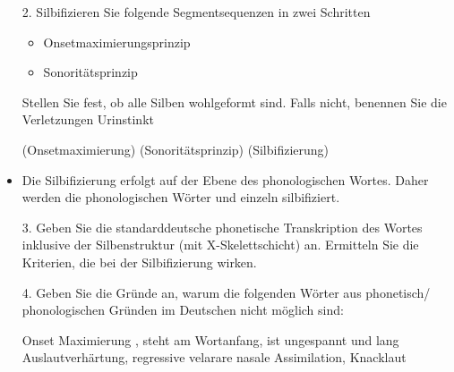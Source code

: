 {\begin{frame}
\begin{exe}
\end{exe}

\end{frame}
	
\begin{frame}
	\begin{itemize}
		\item[2.] Silbifizieren Sie folgende Segmentsequenzen in zwei Schritten
			\begin{itemize}
				\item Onsetmaximierungsprinzip
				\item Sonoritätsprinzip
			\end{itemize}
			
		Stellen Sie fest, ob alle Silben wohlgeformt sind. Falls nicht, benennen Sie die Verletzungen	
		\ea
		Urinstinkt
		\z
		
		\eal
		\ex \textipa{[Pu.\;RI.nStInkt]} (Onsetmaximierung)
		\ex {} (Sonoritätsprinzip)
		\ex {} (Silbifizierung)
		\zl 
		\item Die Silbifizierung erfolgt auf der Ebene des phonologischen Wortes. Daher werden die phonologischen Wörter  und  einzeln silbifiziert.
	
	\end{itemize}
\end{frame}


\begin{frame}
	\begin{itemize}	
		\item[3.] Geben Sie die standarddeutsche phonetische Transkription des Wortes  inklusive der Silbenstruktur (mit X-Skelettschicht) an. Ermitteln Sie die Kriterien, die bei der Silbifizierung wirken.
			
		\end{itemize}
\end{frame}


\begin{frame}
	\begin{itemize}
					
		\item[4.] Geben Sie die Gründe an, warum die folgenden Wörter aus phonetisch/ phonologischen Gründen im Deutschen nicht möglich sind:
			
		\eal
		\ex[*]{\textipa{['Napl.O:t]}} Onset Maximierung \textipa{[pl]}, \textipa{[N]} steht am Wortanfang, \textipa{[O]} ist ungespannt und lang
		\ex[*]{\textipa{[a\;R.'tUng]}} Auslautverhärtung, regressive velarare nasale Assimilation, Knacklaut
		\zl
			
	\end{itemize}
		
\end{frame}
	
}


